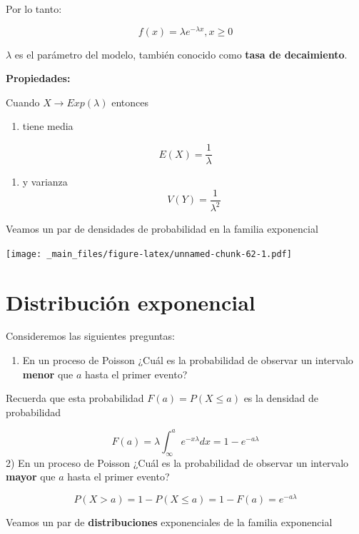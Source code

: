 \documentclass[
]{book}
\providecommand{\tightlist}{%
  \setlength{\itemsep}{0pt}\setlength{\parskip}{0pt}}
\begin{document}
Por lo tanto:

\[f(x)=\lambda e^{-\lambda x}, x\geq 0\]

\(\lambda\) es el parámetro del modelo, también conocido como \textbf{tasa de decaimiento}.

\textbf{Propiedades:}

Cuando \(X \rightarrow Exp(\lambda)\) entonces

\begin{enumerate}
\def\labelenumi{\arabic{enumi})}
\tightlist
\item
  tiene media
\end{enumerate}

\[E(X)=\frac{1}{\lambda}\]

\begin{enumerate}
\def\labelenumi{\arabic{enumi})}
\setcounter{enumi}{1}
\tightlist
\item
  y varianza
  \[V(Y)=\frac{1}{\lambda^2}\]
\end{enumerate}

Veamos un par de densidades de probabilidad en la familia exponencial

\texttt{[image: \_main\_files/figure-latex/unnamed-chunk-62-1.pdf]}

\hypertarget{distribuciuxf3n-exponencial}{%
\section{Distribución exponencial}\label{distribuciuxf3n-exponencial}}

Consideremos las siguientes preguntas:

\begin{enumerate}
\def\labelenumi{\arabic{enumi})}
\tightlist
\item
  En un proceso de Poisson ¿Cuál es la probabilidad de observar un intervalo \textbf{menor} que \(a\) hasta el primer evento?
\end{enumerate}

Recuerda que esta probabilidad \(F(a)=P(X \leq a)\) es la densidad de probabilidad

\[F(a)=\lambda\int_\infty^ae^{-x\lambda}dx=1-e^{-a\lambda}\]
2) En un proceso de Poisson ¿Cuál es la probabilidad de observar un intervalo \textbf{mayor} que \(a\) hasta el primer evento?

\[P(X > a)=1- P(X \leq a)= 1- F(a) = e^{-a\lambda}\]

Veamos un par de \textbf{distribuciones} exponenciales de la familia exponencial
\end{document}
